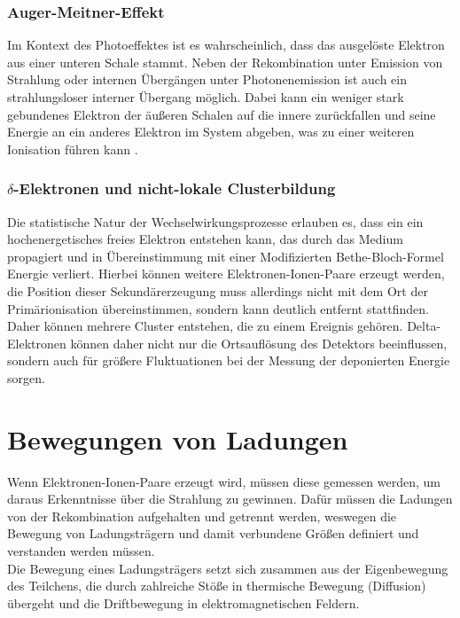 		\subsubsection{Auger-Meitner-Effekt}
			Im Kontext des Photoeffektes ist es wahrscheinlich, dass das ausgelöste Elektron aus einer unteren Schale stammt. Neben der Rekombination unter Emission von Strahlung oder internen Übergängen unter Photonenemission ist auch ein strahlungsloser interner Übergang möglich. Dabei kann ein weniger stark gebundenes Elektron der äußeren Schalen auf die innere zurückfallen und seine Energie an ein anderes Elektron im System abgeben, was zu einer weiteren Ionisation führen kann \cite{Sauli_Multiwire}. 
			
		\subsubsection{$\delta$-Elektronen und nicht-lokale Clusterbildung}
			Die statistische Natur der Wechselwirkungsprozesse erlauben es, dass ein ein hochenergetisches freies Elektron entstehen kann, das durch das Medium propagiert und in Übereinstimmung mit einer Modifizierten Bethe-Bloch-Formel \cite{Leo} Energie verliert. Hierbei können weitere Elektronen-Ionen-Paare erzeugt werden, die Position dieser Sekundärerzeugung muss allerdings nicht mit dem Ort der Primärionisation übereinstimmen, sondern kann deutlich entfernt stattfinden. Daher können mehrere Cluster entstehen, die zu einem Ereignis gehören. Delta-Elektronen können daher nicht nur die Ortsauflösung des Detektors beeinflussen, sondern auch für größere Fluktuationen bei der Messung der deponierten Energie sorgen.
			
		\newpage	
		
	\section{Bewegungen von Ladungen}		
	Wenn Elektronen-Ionen-Paare erzeugt wird, müssen diese gemessen werden, um daraus Erkenntnisse über die Strahlung zu gewinnen. Dafür müssen die Ladungen von der Rekombination aufgehalten und getrennt werden, weswegen die Bewegung von Ladungsträgern und damit verbundene Größen definiert und verstanden werden müssen.\\
	Die Bewegung eines Ladungsträgers setzt sich zusammen aus der Eigenbewegung des Teilchens, die durch zahlreiche Stöße in thermische Bewegung (Diffusion) übergeht und die Driftbewegung in elektromagnetischen Feldern.
	
